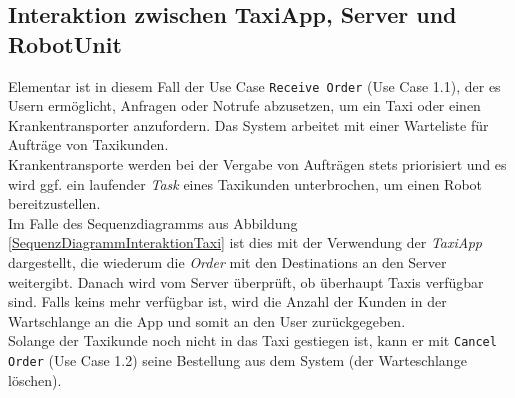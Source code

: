 \subsection*{Interaktion zwischen TaxiApp, Server und RobotUnit}

Elementar ist in diesem Fall der Use Case \texttt{Receive Order} (Use Case 1.1), der es Usern ermöglicht, Anfragen oder Notrufe abzusetzen, um ein Taxi oder einen Krankentransporter anzufordern. 
Das System arbeitet mit einer Warteliste für Aufträge von Taxikunden. \\
Krankentransporte werden bei der Vergabe von Aufträgen stets priorisiert und es wird ggf. ein laufender \emph{Task} eines Taxikunden unterbrochen, um einen Robot bereitzustellen. \\

Im Falle des Sequenzdiagramms aus Abbildung \ref{SequenzDiagrammInteraktionTaxi} ist dies mit der Verwendung der \emph{TaxiApp} dargestellt, die wiederum die \emph{Order} mit den Destinations an den Server weitergibt.
Danach wird vom Server überprüft, ob überhaupt Taxis verfügbar sind.
Falls keins mehr verfügbar ist, wird die Anzahl der Kunden in der Wartschlange an die App und somit an den User zurückgegeben. \\
Solange der Taxikunde noch nicht in das Taxi gestiegen ist, kann er mit \texttt{Cancel Order} (Use Case 1.2) seine Bestellung aus dem System (der Warteschlange löschen). \\

